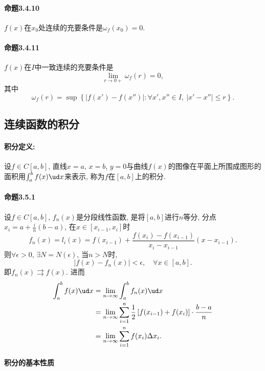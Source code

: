\paragraph{命题3.4.10}

$f(x)$在$x_{0}$处连续的充要条件是$\omega_{f}(x_{0})=0$.

\paragraph{命题3.4.11}

$f(x)$在$I$中一致连续的充要条件是
\[
\lim_{r\to0+}\omega_{f}(r)=0,
\]
其中
\[
\omega_{f}(r)=\sup\left\{ \left|f(x')-f(x'')\right|:\forall x',x''\in I,\ \left|x'-x''\right|\le r\right\} .
\]


\subsection{连续函数的积分}

\paragraph{积分定义:}

设$f\in C[a,b]$, 直线$x=a$, $x=b$, $y=0$与曲线$f(x)$的图像在平面上所围成图形的面积用$\int_{a}^{b}f(x)\ud x$来表示,
称为$f$在$[a,b]$上的积分.

\paragraph{命题3.5.1}

设$f\in C[a,b]$, $f_{n}(x)$是分段线性函数, 是将$[a,b]$进行$n$等分, 分点$x_{i}=a+\frac{i}{n}(b-a)$,
在$x\in[x_{i-1},x_{i}]$时
\[
f_{n}(x)=l_{i}(x)=f(x_{i-1})+\frac{f(x_{i})-f(x_{i-1})}{x_{i}-x_{i-1}}(x-x_{i-1}).
\]
则$\forall\epsilon>0$, $\exists N=N(\epsilon)$, 当$n>N$时, 
\[
\left|f(x)-f_{n}(x)\right|<\epsilon,\quad\forall x\in[a,b].
\]
即$f_{n}(x)\rightrightarrows f(x)$. 进而
\begin{align*}
	\int_{a}^{b}f(x)\ud x & =\lim_{n\to\infty}\int_{a}^{b}f_{n}(x)\ud x\\
	& =\lim_{n\to\infty}\sum_{i=1}^{n}\frac{1}{2}\left[f(x_{i-1})+f(x_{i})\right]\cdot\frac{b-a}{n}\\
	& =\lim_{n\to\infty}\sum_{i=1}^{n}f(x_{i})\Delta x_{i}.
\end{align*}


\paragraph{积分的基本性质}


